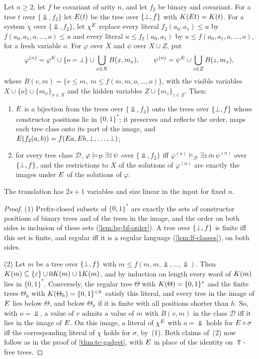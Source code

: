 \begin{proposition}\label{prop:cx-embedding}
Let $n\ge2$, let $f$ be covariant of arity $n$, and let $f_2$ be binary and
covariant. For a tree $t$ over $\{\Bot,f_2\}$ let $E(t)$ be the tree over
$\{\bot,f\}$ with $K(E t)=K(t)$. For a system $\chi$ over
$\{\Bot,f_2\}$, let $\chi^{E}$ replace every literal $f_2(a_0,a_1)\le u$ by
$f(a_0,a_1,o,\ldots,o)\le u$ and every literal $u\le f_2(a_0,a_1)$ by
$u\le f(a_0,a_1,o,\ldots,o)$, for a fresh variable $o$. For $\varphi$ over $X$
and $\psi$ over $X\cup Z$, put
\[
 \varphi^{(n)}=\varphi^{E}\cup\{o=\bot\}\cup\bigcup_{x\in X}B(x,m_x),
 \qquad
 \psi^{(n)}=\psi^{E}\cup\bigcup_{z\in Z}B(z,m_z),
\]
where $B(v,m)=\{v\le m,\ m\le f(m,m,o,\ldots,o)\}$,
with the visible variables $X\cup\{o\}\cup\{m_x\}_{x\in X}$ and the hidden
variables $Z\cup\{m_z\}_{z\in Z}$. Then:
\begin{enumerate}[leftmargin=*]
\item $E$ is a bijection from the trees over $\{\Bot,f_2\}$ onto the trees
  over $\{\bot,f\}$ whose constructor positions lie in $\{0,1\}^*$; it preserves and
  reflects the order, maps each tree class onto its part of the image, and
  $E(f_2(a,b))=f(E a,E b,\bot,\ldots,\bot)$;
\item for every tree class $\mathcal D$,
  $\varphi\models_{\mathcal D}\exists\bar z\,\psi$ over $\{\Bot,f_2\}$ iff
  $\varphi^{(n)}\models_{\mathcal D}\exists\bar z\,\bar m\,\psi^{(n)}$ over
  $\{\bot,f\}$, and the restrictions to $X$ of the solutions of $\varphi^{(n)}$ are
  exactly the images under $E$ of the solutions of $\varphi$.
\end{enumerate}
The translation has $2s+1$ variables and size linear in the input for fixed $n$.
\end{proposition}

\begin{proof}
(1) Prefix-closed subsets of $\{0,1\}^*$ are exactly the sets of constructor
positions of binary trees and of the trees in the image, and the order on both
sides is inclusion of these sets (\cref{lem:bg-bf-order}). A tree over $\{\bot,f\}$ is finite iff this set is finite, and regular iff it is a
regular language (\cref{lem:lf-classes}), on both sides.

(2) Let $m$ be a tree over $\{\bot,f\}$ with $m\le f(m,m,\Bot,\ldots,\Bot)$. Then
$K(m)\subseteq\{\varepsilon\}\cup0K(m)\cup1K(m)$, and by induction on length
every word of $K(m)$ lies in $\{0,1\}^*$. Conversely, the regular tree $\Theta$
with $K(\Theta)=\{0,1\}^*$ and the finite trees $\Theta_h$ with
$K(\Theta_h)=\{0,1\}^{<h}$ satisfy this literal, and every tree in the image
of $E$ lies below $\Theta$, and below $\Theta_h$ if it is finite with all
positions shorter than $h$. So, with $o=\Bot$, a value of $v$ admits a value of
$m$ with $B(v,m)$ in the class $\mathcal D$ iff it lies in the image of
$E$. On this image, a literal of $\chi^{E}$ with $o=\Bot$ holds for
$E\circ\sigma$ iff the corresponding literal of $\chi$ holds for $\sigma$,
by~(1). Both claims of~(2) now follow as in the proof of \cref{thm:tc-gadget},
with $E$ in place of the identity on $\Top$-free trees.
\end{proof}

